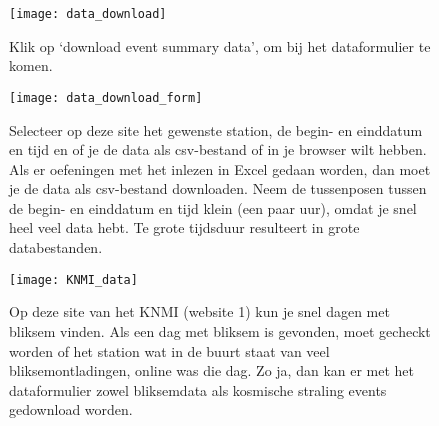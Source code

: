 \begin{figure}
    \centering
    \texttt{[image: data\_download]}
    \caption{Klik op `download event summary data', om bij het dataformulier te komen.}
    \label{fig:data_download}
\end{figure}

\begin{figure}
    \centering
    \texttt{[image: data\_download\_form]}
    \caption{Selecteer op deze site het gewenste station, de begin- en einddatum en tijd 
     en of je de data als csv-bestand of in je browser wilt hebben. Als er oefeningen met 
     het inlezen in Excel gedaan worden, dan moet je de data als csv-bestand downloaden.
     Neem de tussenposen tussen de begin- en einddatum en tijd klein (een paar uur), 
     omdat je snel heel veel data hebt. Te grote tijdsduur resulteert in grote databestanden.}
    \label{fig:data_download_form}
\end{figure}


\begin{figure}
    \centering
    \texttt{[image: KNMI\_data]}
    \caption{Op deze site van het KNMI (website 1) kun je snel dagen met bliksem vinden. Als een dag 
    met bliksem is gevonden, moet gecheckt worden of het \hisparc station wat in de
    buurt staat van veel bliksemontladingen, online was die dag. Zo ja, dan kan 
    er met het dataformulier zowel bliksemdata als kosmische straling events
    gedownload worden.}
    \label{fig:KNMI_data}
\end{figure}



